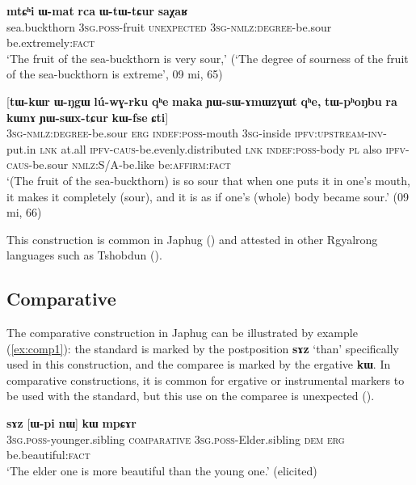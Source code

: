 \documentclass[oneside,a4paper,11pt]{article}
\newcommand{\ipa}[1]{{\phon\textbf{#1}}}
\begin{document}
\begin{exe}
\ex \label{ex:WtWCur}
\gll 
\ipa{mtɕʰi}  	\ipa{ɯ-mat}  	\ipa{rca}  	\ipa{ɯ-tɯ-tɕur}  	\ipa{saχaʁ}  	   \\
sea.buckthorn \textsc{3sg.poss}-fruit \textsc{unexpected} \textsc{3sg-nmlz:degree}-be.sour be.extremely:\textsc{fact}   \\
\glt `The fruit of the sea-buckthorn is very sour,' (`The degree of sourness of the fruit of the sea-buckthorn is extreme', 09 mi, 65)
\end{exe}

\begin{exe}
\ex \label{ex:YWsWxtCur}
\gll 
 	[\ipa{ɯ-tɯ-tɕur}]  	\ipa{\textbf{kɯ}}  	[\ipa{tɯ-kɯr}  	\ipa{ɯ-ŋgɯ}  	\ipa{lú-wɣ-rku}  	\ipa{qʰe}  	\ipa{maka}  	\ipa{ɲɯ-sɯ-ɤmɯzɣɯt}  	\ipa{qʰe,}  	\ipa{tɯ-pʰoŋbu}  	\ipa{ra}  	\ipa{kɯnɤ}  	\ipa{ɲɯ-sɯx-tɕur}  	\ipa{kɯ-fse}  	\ipa{ɕti}]  \\
  \textsc{3sg-nmlz:degree}-be.sour \textsc{erg} \textsc{indef:poss}-mouth \textsc{3sg}-inside \textsc{ipfv:upstream-inv}-put.in \textsc{lnk} at.all \textsc{ipfv-caus}-be.evenly.distributed \textsc{lnk} \textsc{indef:poss}-body \textsc{pl} also \textsc{ipfv-caus}-be.sour \textsc{nmlz:S/A}-be.like be:\textsc{affirm}:\textsc{fact} \\
\glt `(The fruit of the sea-buckthorn) is so sour that when one puts it in one's mouth, it makes it completely (sour), and it is as if one's (whole) body became sour.' (09 mi, 66)
\end{exe}

This construction is common in Japhug (\citealt[8]{jacques16comparative}) and attested in other Rgyalrong languages such as Tshobdun (\citealt[911]{jackson06guanxiju}).

\subsection{Comparative}
The comparative construction in Japhug can be illustrated by example (\ref{ex:comp1}): the  standard is marked by the postposition \ipa{sɤz} `than' specifically used in this construction, and the comparee is marked by the ergative  \ipa{kɯ}. In comparative constructions, it is common for ergative or instrumental markers to be used with the standard, but this use on the comparee is unexpected (\citealt{jacques16comparative}).

\begin{exe}
\ex \label{ex:comp1}
\gll  \ipa{ɯ-ʁi}   	\ipa{sɤz}   	[\ipa{ɯ-pi}   	\ipa{nɯ}]   	\ipa{\textbf{kɯ}}   	\ipa{mpɕɤr}     \\
\textsc{3sg.poss}-younger.sibling \textsc{comparative} \textsc{3sg.poss}-Elder.sibling \textsc{dem} \textsc{erg}  be.beautiful:\textsc{fact} \\
\glt `The elder one is more beautiful than the young one.' (elicited)
\end{exe}
\end{document}
